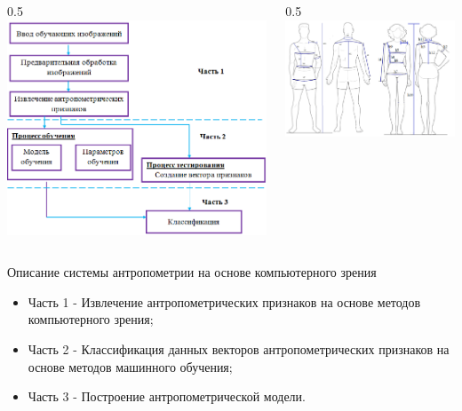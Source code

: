 \documentclass[10pt,pdf,hyperref={unicode},xcolor=table]{beamer}
\begin{document}
\begin{frame}
	\begin{columns}
		\begin{column} {0.5\textwidth}		
			\includegraphics[width=1\linewidth]{p1}
			\end{column}
			\begin{column} {0.5\textwidth}
				\includegraphics[width=1\linewidth]{p2}
			\end{column}      
		\end{columns}
\begin{block}{Описание системы антропометрии на основе компьютерного зрения}
			\begin{itemize}
\item Часть 1 - Извлечение антропометрических признаков на основе методов компьютерного зрения;
\item Часть 2 - Классификация данных векторов антропометрических признаков на основе методов машинного обучения;
\item Часть 3 - Построение антропометрической модели.
\end{itemize}
		\end{block}
\end{frame}
\end{document}
